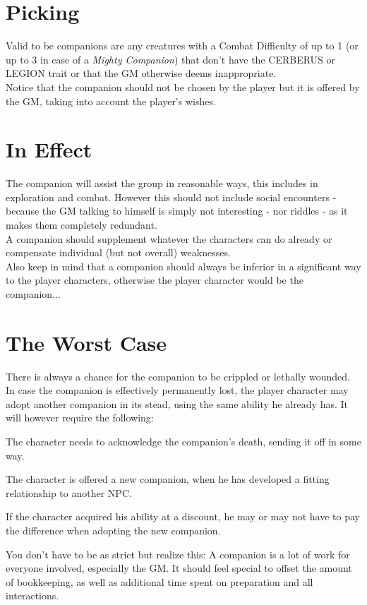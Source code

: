\documentclass[12pt,a4paper,openany,usenames,dvipsnames]{book}
\begin{document}
	\section{Picking}
	Valid to be companions are any creatures with a Combat Difficulty of up to 1 (or up to 3 in case of a \textit{Mighty Companion}) that don't have the CERBERUS or LEGION trait or that the GM otherwise deems inappropriate.\\
	Notice that the companion should not be chosen by the player but it is offered by the GM, taking into account the player's wishes.
	\section{In Effect}
	The companion will assist the group in reasonable ways, this includes in exploration and combat. However this should not include social encounters - because the GM talking to himself is simply not interesting - nor riddles - as it makes them completely redundant.\\
	A companion should supplement whatever the characters can do already or compensate individual (but not overall) weaknesses.\\
	Also keep in mind that a companion should always be inferior in a significant way to the player characters, otherwise the player character would be the companion...
	\section{The Worst Case}
	There is always a chance for the companion to be crippled or lethally wounded. In case the companion is effectively permanently lost, the player character may adopt another companion in its stead, using the same ability he already has. It will however require the following:
	\begin{sitemize}[8]
		\item The character needs to acknowledge the companion's death, sending it off in some way.
		\item The character is offered a new companion, when he has developed a fitting relationship to another NPC.
		\item If the character acquired his ability at a discount, he may or may not have to pay the difference when adopting the new companion.
	\end{sitemize}
	\begin{exampleblock}
		You don't have to be as strict but realize this:
		A companion is a lot of work for everyone involved, especially the GM.
		It should feel special to offset the amount of bookkeeping,
			as well as additional time spent on preparation and all interactions.
	\end{exampleblock}
	
\end{document}
